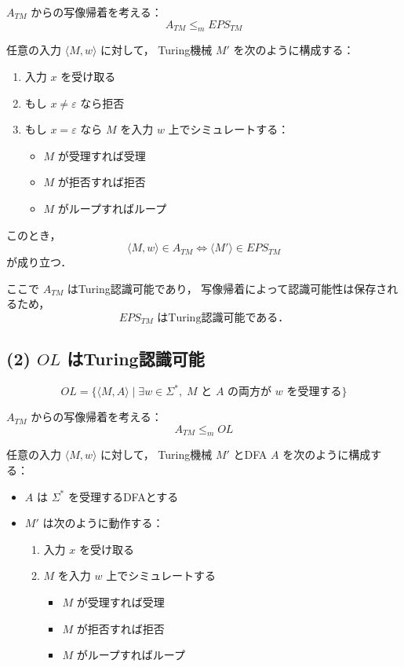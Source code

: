 \documentclass[a4paper,11pt]{ltjsarticle}
\begin{document}
$A_{TM}$ からの写像帰着を考える：
\[
A_{TM} \leq_m EPS_{TM}
\]

任意の入力 $\langle M, w \rangle$ に対して，
Turing機械 $M'$ を次のように構成する：

\begin{enumerate}
    \item 入力 $x$ を受け取る
    \item もし $x \neq \varepsilon$ なら拒否
    \item もし $x = \varepsilon$ なら $M$ を入力 $w$ 上でシミュレートする：
    \begin{itemize}
        \item $M$ が受理すれば受理
        \item $M$ が拒否すれば拒否
        \item $M$ がループすればループ
    \end{itemize}
\end{enumerate}

このとき，
\[
\langle M, w \rangle \in A_{TM}
\iff
\langle M' \rangle \in EPS_{TM}
\]
が成り立つ．

ここで $A_{TM}$ はTuring認識可能であり，
写像帰着によって認識可能性は保存されるため，
\[
EPS_{TM} \text{ はTuring認識可能である．}
\]

\subsection*{(2) $OL$ はTuring認識可能}

\[
OL = \{ \langle M, A \rangle \mid \exists w \in \Sigma^*,\;
M \text{ と } A \text{ の両方が } w \text{ を受理する} \}
\]

$A_{TM}$ からの写像帰着を考える：
\[
A_{TM} \leq_m OL
\]

任意の入力 $\langle M, w \rangle$ に対して，
Turing機械 $M'$ とDFA $A$ を次のように構成する：

\begin{itemize}
    \item $A$ は $\Sigma^*$ を受理するDFAとする
    \item $M'$ は次のように動作する：
    \begin{enumerate}
        \item 入力 $x$ を受け取る
        \item $M$ を入力 $w$ 上でシミュレートする
        \begin{itemize}
            \item $M$ が受理すれば受理
            \item $M$ が拒否すれば拒否
            \item $M$ がループすればループ
        \end{itemize}
    \end{enumerate}
\end{itemize}
\end{document}
